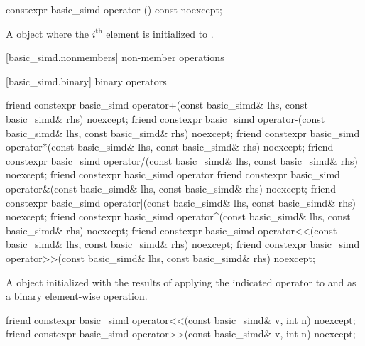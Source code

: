 \begin{itemdecl}
constexpr basic_simd operator-() const noexcept;
\end{itemdecl}

\begin{itemdescr}
  \pnum{}

  \pnum\returns
  A  object where the $i^\text{th}$ element is initialized to  \foralli.
\end{itemdescr}

[basic_simd.nonmembers]{ non-member operations}

[basic_simd.binary]{ binary operators}

\begin{itemdecl}
friend constexpr basic_simd operator+(const basic_simd& lhs, const basic_simd& rhs) noexcept;
friend constexpr basic_simd operator-(const basic_simd& lhs, const basic_simd& rhs) noexcept;
friend constexpr basic_simd operator*(const basic_simd& lhs, const basic_simd& rhs) noexcept;
friend constexpr basic_simd operator/(const basic_simd& lhs, const basic_simd& rhs) noexcept;
friend constexpr basic_simd operator%
friend constexpr basic_simd operator&(const basic_simd& lhs, const basic_simd& rhs) noexcept;
friend constexpr basic_simd operator|(const basic_simd& lhs, const basic_simd& rhs) noexcept;
friend constexpr basic_simd operator^(const basic_simd& lhs, const basic_simd& rhs) noexcept;
friend constexpr basic_simd operator<<(const basic_simd& lhs, const basic_simd& rhs) noexcept;
friend constexpr basic_simd operator>>(const basic_simd& lhs, const basic_simd& rhs) noexcept;
\end{itemdecl}

\begin{itemdescr}
  \pnum\ConstraintOperatorTWellFormed

  \pnum\returns
  A  object initialized with the results of applying the indicated operator to  and  as a binary element-wise operation.
\end{itemdescr}

\begin{itemdecl}
friend constexpr basic_simd operator<<(const basic_simd& v, int n) noexcept;
friend constexpr basic_simd operator>>(const basic_simd& v, int n) noexcept;
\end{itemdecl}

